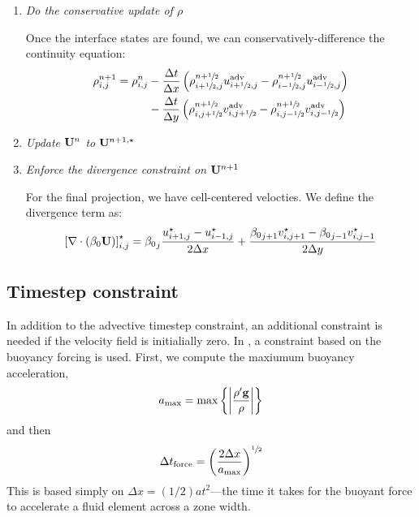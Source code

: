 \begin{enumerate}
  
\item {\em Do the conservative update of $\rho$}

  Once the interface states are found, we can conservatively-difference
the continuity equation:
\begin{align}
\rho^{n+1}_{i,j} = \rho^n_{i,j} 
   &- \frac{\Delta t}{\Delta x} 
      \left (\rho_{i+{\sfrac{1}{2}},j}^{n+{\sfrac{1}{2}}} u^\mathrm{adv}_{i+{\sfrac{1}{2}},j} -
             \rho_{i-{\sfrac{1}{2}},j}^{n+{\sfrac{1}{2}}} u^\mathrm{adv}_{i-{\sfrac{1}{2}},j} \right ) \nonumber \\
   &- \frac{\Delta t}{\Delta y}
      \left (\rho_{i,j+{\sfrac{1}{2}}}^{n+{\sfrac{1}{2}}} v^\mathrm{adv}_{i,j+{\sfrac{1}{2}}} -
             \rho_{i,j-{\sfrac{1}{2}}}^{n+{\sfrac{1}{2}}} v^\mathrm{adv}_{i,j-{\sfrac{1}{2}}} \right )
\end{align}


\item {\em Update ${\bf U}^n$ to ${\bf U}^{n+1,\star}$}
  
\item {\em Enforce the divergence constraint on ${\bf U}^{n+1}$}

  For the final projection, we have cell-centered velocties.  We 
  define the divergence term as:
  \begin{equation}
    \left [ \nabla \cdot (\beta_0 {\bf U}) \right ]_{i,j}^\star =
          {\beta_0}_j \frac{u^\star_{i+1,j} - 
            u^\star_{i-1,j}}{2\Delta x} +
          \frac{{\beta_0}_{j+1} v^\star_{i,j+1} - 
            {\beta_0}_{j-1} v^\star_{i,j-1} }{2\Delta y}
  \end{equation}

  
\end{enumerate}


\subsection{Timestep constraint}

In addition to the advective timestep constraint, an additional constraint
is needed if the velocity field is initialially zero.  In \cite{ABNZ:III},
a constraint based on the buoyancy forcing is used.  First, we compute
the maxiumum buoyancy acceleration,
\begin{equation}
a_\mathrm{max} = \max \left \{ \left |\frac{\rho'{\bf g}}{\rho} \right | \right \}
\end{equation}
and then 
\begin{equation}
\Delta t_\mathrm{force} = \left ( \frac{2 \Delta x}{a_\mathrm{max}} \right )^{{\sfrac{1}{2}}} 
\end{equation}
This is based simply on $\Delta x = (1/2) a t^2$---the
time it takes for the buoyant force to accelerate a fluid element
across a zone width.


